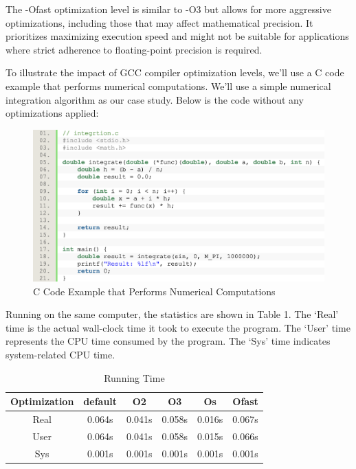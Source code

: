 \documentclass[conference]{IEEEtran}
\begin{document}
The -Ofast optimization level is similar to -O3 but allows for more aggressive optimizations, including those that may affect mathematical precision. It prioritizes maximizing execution speed and might not be suitable for applications where strict adherence to floating-point precision is required.

To illustrate the impact of GCC compiler optimization levels, we'll use a C code example that performs numerical computations. We'll use a simple numerical integration algorithm as our case study. Below is the code without any optimizations applied:

\begin{figure}[htbp]
\centering
\includegraphics [width=0.9\linewidth]{pictures/gcc_sample_code.png}
\caption{C Code Example that Performs Numerical Computations\cite{b3}}
\label{fig4}
\end{figure}

Running on the same computer, the statistics are shown in Table 1. The `Real' time is the actual wall-clock time it took to execute the program. The `User' time represents the CPU time consumed by the program. The `Sys' time indicates system-related CPU time.\cite{b3}

\begin{table}
	\caption{Running Time\cite{b3}}
	\begin{center}
		\begin{tabular}{c c c c c c}
			\toprule
			Optimization &default&O2&O3&Os&Ofast\\
			\hline
			Real & 0.064s & 0.041s & 0.058s & 0.016s & 0.067s\\
			User & 0.064s & 0.041s & 0.058s & 0.015s & 0.066s\\
			Sys  & 0.001s & 0.001s & 0.001s & 0.001s & 0.001s\\
			\bottomrule
		\end{tabular}
	\end{center}
\end{table}
\end{document}
